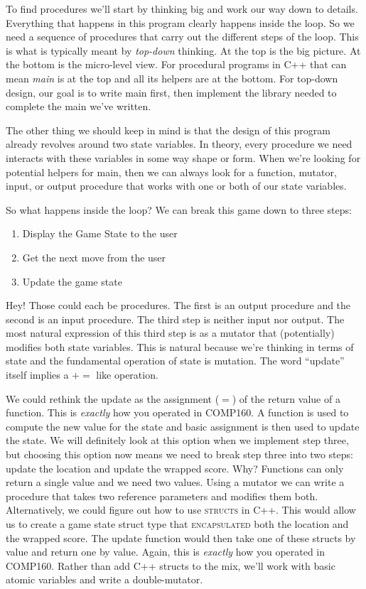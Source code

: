 \documentclass[nobib]{tufte-handout}
\begin{document}
To find procedures we'll start by thinking big and work our way down to details. Everything that happens in this program clearly happens inside the loop. So we need a sequence of procedures that carry out the different steps of the loop. This is what is typically meant by \textit{top-down} thinking. At the top is the big picture. At the bottom is the micro-level view. For procedural programs in C++ that can mean \textit{main} is at the top and all its helpers are at the bottom. For top-down design, our goal is to write main first, then implement the library needed to complete the main we've written.

The other thing we should keep in mind is that the design of this program already revolves around two state variables. In theory, every procedure we need interacts with these variables in some way shape or form. When we're looking for potential helpers for main, then we can always look for a function, mutator, input, or output procedure that works with one or both of our state variables.

So what happens inside the loop? We can break this game down to three steps:
\begin{enumerate}
\item Display the Game State to the user
\item Get the next move from the user
\item Update the game state
\end{enumerate}
Hey! Those could each be procedures. The first is an output procedure and the second is an input procedure. The third step is neither input nor output. The most natural expression of this third step is as a mutator that (potentially) modifies both state variables. This is natural because we're thinking in terms of state and the fundamental operation of state is mutation. The word ``update'' itself implies a $+=$ like operation.

We could rethink the update as the assignment ($=$) of the return value of a function. This is \textit{exactly} how you operated in COMP160. A function is used to compute the new value for the state and basic assignment is then used to update the state. We will definitely look at this option when we implement step three, but choosing this option now means we need to break step three into two steps: update the location and update the wrapped score. Why? Functions can only return a single value and we need two values. Using a mutator we can write a procedure that takes two reference parameters and modifies them both. Alternatively, we could figure out how to use \textsc{structs} in C++. This would allow us to create a game state struct type that \textsc{encapsulated} both the location and the wrapped score. The update function would then take one of these structs by value and return one by value. Again, this is \textit{exactly} how you operated in COMP160. Rather than add C++ structs to the mix, we'll work with basic atomic variables and write a double-mutator.
\end{document}
